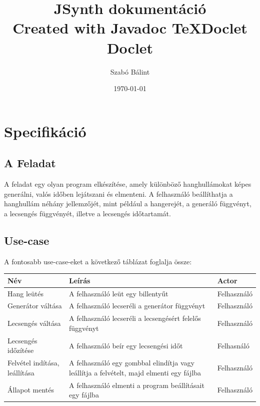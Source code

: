 \documentclass[11pt,a4paper]{report}
\begin{document}
	
	\date{\today}
	\title{JSynth dokumentáció\bigskip\\ \Large Created with Javadoc TeXDoclet Doclet}
	\author{Szabó Bálint}
	\maketitle
	
	\tableofcontents
	
	\chapter{Specifikáció}
	
	\section{A Feladat}
	A feladat egy olyan program elkészítése, amely különböző hanghullámokat képes generálni, valós időben lejátszani és elmenteni. A felhasználó beállíthatja a hanghullám néhány jellemzőjét, mint például a hangerejét, a generáló függvényt, a lecsengés függvényét, illetve a lecsengés időtartamát.
	\section{Use-case}
	A fontosabb use-case-eket a következő táblázat foglalja össze: \\
	\begin{center}
	\begin{tabular}{|l|p{8cm}|l|}
		\hline
		Név & Leírás & Actor \\ \hline
		Hang leütés & A felhasználó leüt egy billentyűt & Felhasználó \\ \hline
		Generátor váltása & A felhasználó lecseréli a generátor függvényt & Felhasználó \\ \hline
		Lecsengés váltása & A felhasználó lecseréli a lecsengésért felelős függvényt & Felhasználó \\ \hline
		Lecsengés időzítése & A felhasználó beír egy lecsengési időt & Felhasnáló \\ \hline
		Felvétel indítása, leállítása & A felhasználó egy gombbal elindítja vagy leállítja a felvételt, majd elmenti egy fájlba & Felhasználó \\ \hline
		Állapot mentés & A felhasználó elmenti a program beállításait egy fájlba & Felhasználó \\ \hline
	\end{tabular}
	\end{center}
	
\end{document}
